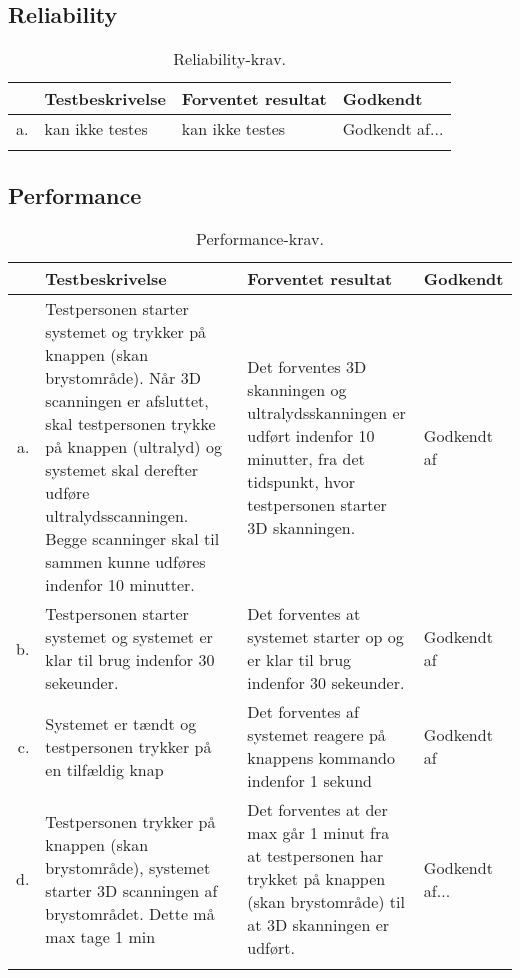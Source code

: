 \subsection{Reliability}
\begin{longtabu} to 
    &    Testbeskrivelse &    Forventet resultat &    Godkendt\\[-1ex]
    \midrule
    a. &    kan ikke testes & kan ikke testes   &    Godkendt af...\\
\caption{Reliability-krav.}
\label{AT_r1}
\end{longtabu}

\subsection{Performance}
\begin{longtabu} to 
    &    Testbeskrivelse &    Forventet resultat &    Godkendt\\[-1ex]
    \midrule
    a. &    Testpersonen starter systemet og trykker på knappen (skan brystområde). Når 3D scanningen er afsluttet, skal testpersonen trykke på knappen (ultralyd) og systemet skal derefter udføre ultralydsscanningen. Begge scanninger skal til sammen kunne udføres indenfor 10 minutter. &   Det forventes 3D skanningen og ultralydsskanningen er udført indenfor 10 minutter, fra det tidspunkt, hvor testpersonen starter 3D skanningen. &    Godkendt af\\
    
    b. & Testpersonen starter systemet og systemet er klar til brug indenfor 30 sekeunder. &    Det forventes at systemet starter op og er klar til brug indenfor 30 sekeunder. &    Godkendt af\\
    
    c. &  Systemet er tændt og testpersonen trykker på en tilfældig knap &   Det forventes af systemet reagere på knappens kommando indenfor 1 sekund  &    Godkendt af\\
    d. &  Testpersonen trykker på knappen (skan brystområde), systemet starter 3D scanningen af brystområdet. Dette må max tage 1 min  &   Det forventes at der max går 1 minut fra at testpersonen har trykket på knappen (skan brystområde) til at 3D skanningen er udført.  &    Godkendt af...\\
    
\caption{Performance-krav.}
\label{AT_p1}
\end{longtabu}

